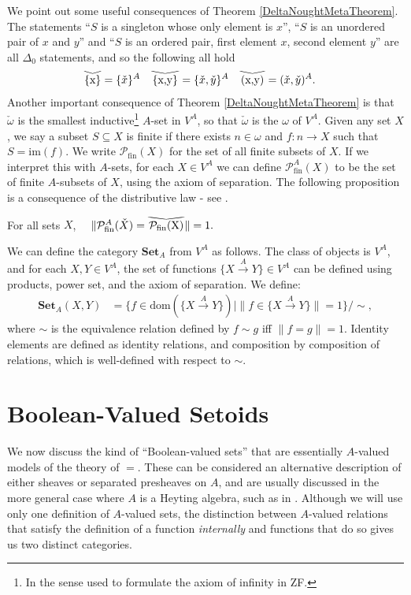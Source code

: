 \documentclass{lmcs}
\newcommand{\pfin}{\ensuremath{\powerset_{\mathrm{fin}}}}
\newcommand{\dom}{\ensuremath{\mathrm{dom}}}
\newcommand{\Set}{\cat{Set}}
\newcommand{\cat}[1]{\ensuremath{\mathbf{#1}}}
\newcommand{\im}{\mathrm{im}} %
\newcommand{\powerset}{\ensuremath{\mathcal{P}}}
\newcommand{\apowerset}{\powerset^A}
\newcommand{\apfin}{\apowerset_{\mathrm{fin}}}
\newcommand{\verywidecheck}[1]{
	\savestack{\tmpbox}{\stretchto{
			\scaleto{
				\scalerel*[\widthof{\ensuremath{#1}}]{\kern-.6pt\bigvee\kern-.6pt}
				{\rule[-\textheight/2]{1ex}{\textheight}}
			}{\textheight}
		}{0.5ex}}
	\stackon[1pt]{#1}{\tmpbox}
}
\newcommand{\ahom}[2]{\{ #1 \overset{A}{\rightarrow} #2 \}}
\begin{document}
We point out some useful consequences of Theorem \ref{DeltaNoughtMetaTheorem}. The statements ``$S$ is a singleton whose only element is $x$'', ``$S$ is an unordered pair of $x$ and $y$'' and ``$S$ is an ordered pair, first element $x$, second element $y$'' are all $\Delta_0$ statements, and so the following all hold
\begin{align*}
	\verywidecheck{\{x\}} &= \{\check{x}\}^A & \verywidecheck{\{x,y\}} &= \{ \check{x},\check{y} \}^A & \verywidecheck{(x,y)} &= (\check{x},\check{y})^A.
\end{align*}
%
Another important consequence of Theorem \ref{DeltaNoughtMetaTheorem} is that $\check{\omega}$ is the smallest inductive\footnote{In the sense used to formulate the axiom of infinity in ZF.} $A$-set in $V^A$, so that $\check{\omega}$ is the $\omega$ of $V^A$. Given any set $X$, we say a subset $S \subseteq X$ is finite if there exists $n \in \omega$ and $f : n \rightarrow X$ such that $S = \im(f)$. We write $\pfin(X)$ for the set of all finite subsets of $X$. If we interpret this with $A$-sets, for each $X \in V^A$ we can define $\apfin(X)$ to be the set of finite $A$-subsets of $X$, using the axiom of separation. The following proposition is a consequence of the distributive law - see \cite[3.1.11]{kusraev}.
\begin{prop}
	\label{FiniteSetPreservationProp}
	For all sets $X$, 
	$
	~~~\| \apfin(\check{X}) = \verywidecheck{\pfin(X)} \| = 1.
	$
\end{prop}

We can define the category $\Set_A$ from $V^A$ as follows. The class of objects is $V^A$, and for each $X,Y \in V^A$, the set of functions $\ahom{X}{Y} \in V^A$ can be defined using products, power set, and the axiom of separation. We define:
\begin{align*}
	\Set_A(X,Y) &= \{ f \in \dom(\ahom{X}{Y}) \mid \| f \in \ahom{X}{Y} \| = 1 \}/\sim,
\end{align*}
where $\sim$ is the equivalence relation defined by $f \sim g$ iff $\| f = g \| = 1$. Identity elements are defined as identity relations, and composition by composition of relations, which is well-defined with respect to $\sim$.


\section{Boolean-Valued Setoids}
\label{SetoidSection}
We now discuss the kind of ``Boolean-valued sets'' that are essentially $A$-valued models of the theory of $=$. These can be considered an alternative description of either sheaves or separated presheaves on $A$, and are usually discussed in the more general case where $A$ is a Heyting algebra, such as in \cite{fourman1979,goldblatt,monroA}. %
Although we will use only one definition of $A$-valued sets, the distinction between $A$-valued relations that satisfy the definition of a function \emph{internally} and functions that do so gives us two distinct categories. 
\end{document}
